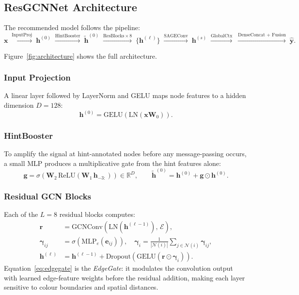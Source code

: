 \documentclass[11pt]{article}
\begin{document}
\subsection{ResGCNNet Architecture}
\label{sec:resgcnnet}

The recommended model follows the pipeline:
\[
  \mathbf{x} \;\xrightarrow{\text{InputProj}}\;
  \mathbf{h}^{(0)} \;\xrightarrow{\text{HintBooster}}\;
  \tilde{\mathbf{h}}^{(0)} \;\xrightarrow{\text{ResBlocks} \times 8}\;
  \{\mathbf{h}^{(\ell)}\} \;\xrightarrow{\text{SAGEConv}}\;
  \mathbf{h}^{(s)} \;\xrightarrow{\text{GlobalCtx}}\;
  \xrightarrow{\text{DenseConcat + Fusion}}\;
  \hat{\mathbf{y}}.
\]

Figure~\ref{fig:architecture} shows the full architecture.

\subsubsection*{Input Projection}
A linear layer followed by LayerNorm and GELU maps node features to a hidden dimension
$D = 128$:
\[
  \mathbf{h}^{(0)} = \text{GELU}(\text{LN}(\mathbf{x}\mathbf{W}_0)).
\]

\subsubsection*{HintBooster}
To amplify the signal at hint-annotated nodes before any message-passing occurs, a small
MLP produces a multiplicative gate from the hint features alone:
\[
  \mathbf{g} = \sigma\!\left(\mathbf{W}_2\,\text{ReLU}(\mathbf{W}_1\,\mathbf{h}_{-3:})\right)
  \in \mathbb{R}^D,
  \qquad
  \tilde{\mathbf{h}}^{(0)} = \mathbf{h}^{(0)} + \mathbf{g} \odot \mathbf{h}^{(0)}.
\]

\subsubsection*{Residual GCN Blocks}
Each of the $L = 8$ residual blocks computes:
\begin{align}
  \mathbf{r} &= \text{GCNConv}\!\left(\text{LN}(\mathbf{h}^{(\ell-1)}),\,
                 \mathcal{E}\right), \\
  \bm{\gamma}_{ij} &= \sigma\!\left(\text{MLP}_e(\mathbf{e}_{ij})\right),\quad
  \bm{\gamma}_i = \frac{1}{|\mathcal{N}(i)|}\sum_{j \in \mathcal{N}(i)} \bm{\gamma}_{ij},
  \label{eq:edgegate}\\
  \mathbf{h}^{(\ell)} &= \mathbf{h}^{(\ell-1)}
    + \text{Dropout}\!\left(\text{GELU}(\mathbf{r} \odot \bm{\gamma}_i)\right).
\end{align}
Equation~\eqref{eq:edgegate} is the \emph{EdgeGate}: it modulates the convolution output
with learned edge-feature weights before the residual addition, making each layer sensitive
to colour boundaries and spatial distances.
\end{document}
